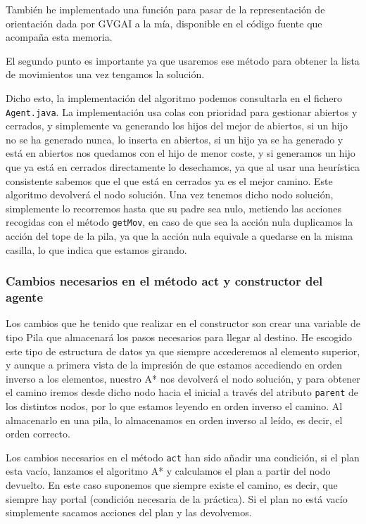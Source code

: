\documentclass[10pt, spanish]{article}
\begin{document}
También he implementado una función para pasar de la representación de orientación dada por GVGAI a la mía, disponible en el código fuente que acompaña esta memoria.

El segundo punto es importante ya que usaremos ese método para obtener la lista de movimientos una vez tengamos la solución.

Dicho esto, la implementación del algoritmo podemos consultarla en el fichero \texttt{Agent.java}. La implementación usa colas con prioridad para gestionar abiertos y cerrados, y simplemente va generando los hijos del mejor de abiertos, si un hijo no se ha generado nunca, lo inserta en abiertos, si un hijo ya se ha generado y está en abiertos nos quedamos con el hijo de menor coste, y si generamos un hijo que ya está en cerrados directamente lo desechamos, ya que al usar una heurística consistente sabemos que el que está en cerrados ya es el mejor camino. Este algoritmo devolverá el nodo solución. Una vez tenemos dicho nodo solución, simplemente lo recorremos hasta que su padre sea nulo, metiendo las acciones recogidas con el método \texttt{getMov}, en caso de que sea la acción nula duplicamos la acción del tope de la pila, ya que la acción nula equivale a quedarse en la misma casilla, lo que indica que estamos girando.

\subsubsection{Cambios necesarios en el método act y constructor del agente}

Los cambios que he tenido que realizar en el constructor son crear una variable de tipo Pila que almacenará los pasos necesarios para llegar al destino. He escogido este tipo de estructura de datos ya que siempre accederemos al elemento superior, y aunque a primera vista de la impresión de que estamos accediendo en orden inverso a los elementos, nuestro A* nos devolverá el nodo solución, y para obtener el camino iremos desde dicho nodo hacia el inicial a través del atributo \texttt{parent} de los distintos nodos, por lo que estamos leyendo en orden inverso el camino. Al almacenarlo en una pila, lo almacenamos en orden inverso al leído, es decir, el orden correcto.

Los cambios necesarios en el método \texttt{act} han sido añadir una condición, si el plan esta vacío, lanzamos el algoritmo A* y calculamos el plan a partir del nodo devuelto. En este caso suponemos que siempre existe el camino, es decir, que siempre hay portal (condición necesaria de la práctica). Si el plan no está vacío simplemente sacamos acciones del plan y las devolvemos.
\end{document}
